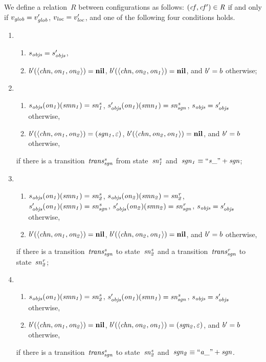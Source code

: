 We define a relation~$R$ between configurations as follows: $(\it{cf}, \it{cf'})\in R$ if and only if $v_{\it{glob}} = v_{\it{glob}}'$, $v_{\it{loc}} = v_{\it{loc}}'$, and one of the following four conditions holds.
%
\begin{enumerate}
\item
  \begin{enumerate}
    \item
      $s_{\it{objs}} = s_{\it{objs}}'$,
    \item
      $b'(\langle \it{chn}, \it{on_1}, \it{on_2} \rangle) = \mathbf{nil}$,
      $b'(\langle \it{chn}, \it{on_2}, \it{on_1} \rangle) = \mathbf{nil}$,
      and $b' = b$ otherwise;
  \end{enumerate}

\item
  \begin{enumerate}
    \item
      $s_{\it{objs}}(\it{on_1})(\it{smn_1}) = \it{sn^s_1}$,
      $s_{\it{objs}}'(\it{on_1})(\it{smn_1}) = \it{sn^s_{sgn}}$,
      $s_{\it{objs}} = s_{\it{objs}}'$ otherwise,
    \item
      $b'(\langle \it{chn}, \it{on_1}, \it{on_2}\rangle) = (\it{sgn_1}, \varepsilon)$,
      $b'(\langle \it{chn}, \it{on_2}, \it{on_1}\rangle) = \mathbf{nil}$,
      and $b' = b$ otherwise,
  \end{enumerate}
  if there is a transition~$\it{trans^s_{sgn}}$ from state~$\it{sn^s_1}$ and~$\it{sgn_1} \equiv ``s\_" + \it{sgn}$;

\item
  \begin{enumerate}
    \item
      $s_{\it{objs}}(\it{on_1})(\it{smn_1}) = \it{sn^s_2}$,
      $s_{\it{objs}}(\it{on_2})(\it{smn_2}) = \it{sn^r_2}$,
      $s_{\it{objs}}'(\it{on_1})(\it{smn_1}) = \it{sn^s_{sgn}}$,
      $s_{\it{objs}}'(\it{on_2})(\it{smn_2}) = \it{sn^r_{sgn}}$,
      $s_{\it{objs}} = s_{\it{objs}}'$ otherwise,
    \item
      $b'(\langle \it{chn}, \it{on_1}, \it{on_2}\rangle) = \mathbf{nil}$,
      $b'(\langle \it{chn}, \it{on_2}, \it{on_1}\rangle) = \mathbf{nil}$,
      and $b' = b$ otherwise,
  \end{enumerate}
  if there is a transition~$\it{trans^s_{sgn}}$ to state~$\it{sn^s_2}$ and a transition~$\it{trans^r_{sgn}}$ to state~$\it{sn^r_2}$;

\item
  \begin{enumerate}
    \item
      $s_{\it{objs}}(\it{on_1})(\it{smn_1}) = \it{sn^s_2}$,
      $s_{\it{objs}}'(\it{on_1})(\it{smn_1}) = \it{sn^s_{sgn}}$,
      $s_{\it{objs}} = s_{\it{objs}}'$ otherwise,
    \item
      $b'(\langle \it{chn}, \it{on_1}, \it{on_2}\rangle) = \mathbf{nil}$,
      $b'(\langle \it{chn}, \it{on_2}, \it{on_1}\rangle) = (\it{sgn_2}, \varepsilon)$,
      and $b' = b$ otherwise,
  \end{enumerate}
  if there is a transition~$\it{trans^s_{sgn}}$ to state~$\it{sn^s_2}$ and~$\it{sgn_2} \equiv ``a\_" + \it{sgn}$.
\end{enumerate}
